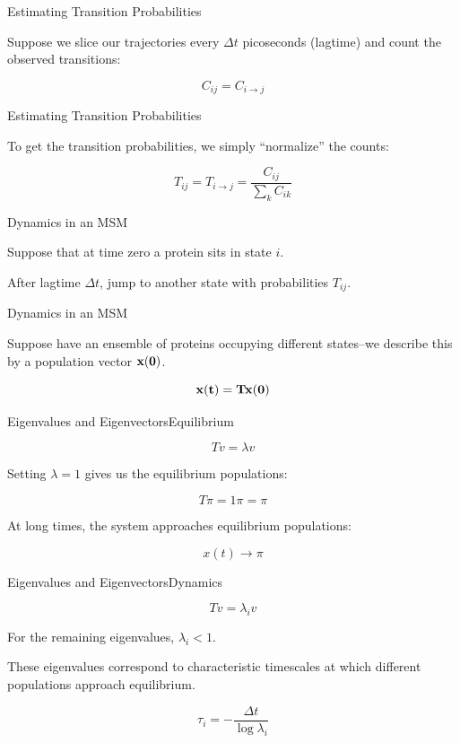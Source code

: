 \documentclass[10pt]{beamer}
\begin{document}
\begin{frame}{Estimating Transition Probabilities}
 
 Suppose we slice our trajectories every $\Delta t$ picoseconds (lagtime) and count the observed transitions:
 
 $$C_{ij} = C_{i \rightarrow j}$$
 
\end{frame}

\begin{frame}{Estimating Transition Probabilities}
 
 To get the transition probabilities, we simply ``normalize'' the counts:
 
 $$T_{ij} = T_{i\rightarrow j}  = \frac{C_{ij}}{\sum_k C_{ik}}$$
 
\end{frame}

\begin{frame}{Dynamics in an MSM}
 
 Suppose that at time zero a protein sits in state $i$.  
 
\vspace{5mm} 

 After lagtime $\Delta t$, jump to another state with probabilities $T_{ij}$.  
 
 \end{frame}
 
 \begin{frame}{Dynamics in an MSM}
 
 Suppose have an ensemble of proteins occupying different states--we describe this by a population vector $\bf{x}(0)$.
 
 $$\bf{x}(t) = T \bf{x}(0)$$
 
\end{frame}

\begin{frame}{Eigenvalues and Eigenvectors}{Equilibrium}
 
 $$T v = \lambda v$$
 
 Setting $\lambda = 1$ gives us the equilibrium populations:
 
 $$T \pi = 1 \pi = \pi$$
 
 At long times, the system approaches equilibrium populations:
 
 $$x(t) \rightarrow \pi$$
 
\end{frame}

\begin{frame}{Eigenvalues and Eigenvectors}{Dynamics}
 
 $$T v = \lambda_i v$$
 
For the remaining eigenvalues, $\lambda_i < 1$.

These eigenvalues correspond to characteristic timescales at which different populations approach equilibrium.

$$ \tau_i = -\frac{\Delta t}{\log \lambda_i}$$
 
 
\end{frame}
\end{document}
